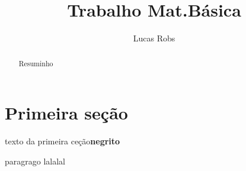 \documentclass[a4paper,10pt]{article}
\title{Trabalho Mat.Básica}
\author{Lucas Robs}
\begin{document}
\maketitle

\begin{abstract}
Resuminho
\end{abstract}

\section{Primeira seção}
 texto da primeira ceção\textbf{negrito}
 
 paragrago
 lalalal
 
\end{document}
